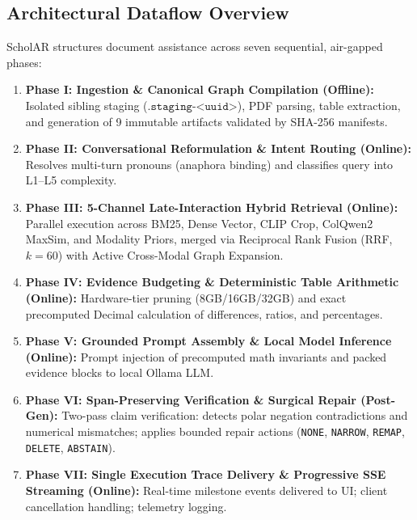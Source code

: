 \documentclass[11pt,a4paper]{article}
\begin{document}
\subsection{Architectural Dataflow Overview}
ScholAR structures document assistance across seven sequential, air-gapped phases:
\begin{enumerate}[leftmargin=*]
    \item \textbf{Phase I: Ingestion \& Canonical Graph Compilation (Offline):} Isolated sibling staging ($\texttt{.staging-<uuid>}$), PDF parsing, table extraction, and generation of 9 immutable artifacts validated by SHA-256 manifests.
    \item \textbf{Phase II: Conversational Reformulation \& Intent Routing (Online):} Resolves multi-turn pronouns (anaphora binding) and classifies query into L1--L5 complexity.
    \item \textbf{Phase III: 5-Channel Late-Interaction Hybrid Retrieval (Online):} Parallel execution across BM25, Dense Vector, CLIP Crop, ColQwen2 MaxSim, and Modality Priors, merged via Reciprocal Rank Fusion (RRF, $k=60$) with Active Cross-Modal Graph Expansion.
    \item \textbf{Phase IV: Evidence Budgeting \& Deterministic Table Arithmetic (Online):} Hardware-tier pruning (8GB/16GB/32GB) and exact precomputed Decimal calculation of differences, ratios, and percentages.
    \item \textbf{Phase V: Grounded Prompt Assembly \& Local Model Inference (Online):} Prompt injection of precomputed math invariants and packed evidence blocks to local Ollama LLM.
    \item \textbf{Phase VI: Span-Preserving Verification \& Surgical Repair (Post-Gen):} Two-pass claim verification: detects polar negation contradictions and numerical mismatches; applies bounded repair actions (\texttt{NONE}, \texttt{NARROW}, \texttt{REMAP}, \texttt{DELETE}, \texttt{ABSTAIN}).
    \item \textbf{Phase VII: Single Execution Trace Delivery \& Progressive SSE Streaming (Online):} Real-time milestone events delivered to UI; client cancellation handling; telemetry logging.
\end{enumerate}
\end{document}
